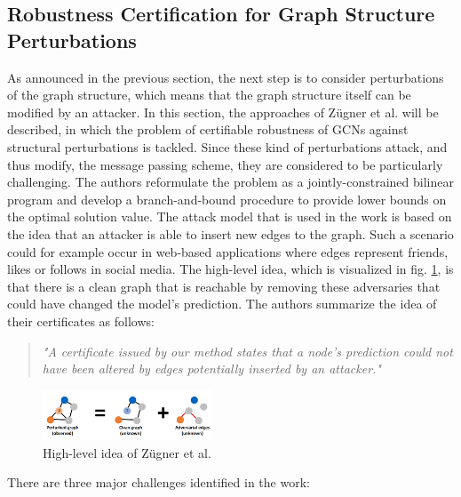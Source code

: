 \documentclass[a4paper,preprint]{sig-alternate}
\begin{document}
\subsection{Robustness Certification for Graph Structure Perturbations}
\label{sec:paper_three}

As announced in the previous section, the next step is to consider perturbations of the graph structure,
which means that the graph structure itself can be modified by an attacker.
In this section, the approaches of Zügner et al. \cite{10.1145/3394486.3403217} will be described, in which the
problem of certifiable robustness of GCNs against structural perturbations is tackled. 
Since these kind of perturbations attack, and thus modify, the message passing scheme, they are considered to be particularly challenging. \cite{10.1145/3394486.3403217} 
The authors reformulate the problem as a jointly-constrained bilinear program and develop a branch-and-bound procedure 
to provide lower bounds on the optimal solution value. The attack model that is used in the work is based on the idea that an attacker 
is able to insert new edges to the graph. Such a scenario could for example occur in web-based applications where edges represent friends, 
likes or follows in social media. \cite{10.1145/3394486.3403217}
The high-level idea, which is visualized in fig. \ref{fig:high_level}, is that there is a clean graph that is reachable by removing
these adversaries that could have changed the model's prediction.
The authors summarize the idea of their certificates as follows:
\begin{quote}
    \emph{"A certificate issued by our method states that a node's prediction could not have been altered by edges potentially
    inserted by an attacker."} \cite{10.1145/3394486.3403217}
\end{quote}
\begin{figure}[h]
    \centering
    \includegraphics[width=0.45\textwidth]{img/high_level_graph_pert.png}
    \caption{High-level idea of Zügner et al. \cite{10.1145/3394486.3403217}}
    \label{fig:high_level}
\end{figure}

\vfill
\pagebreak

There are three major challenges identified in the work:
\end{document}
